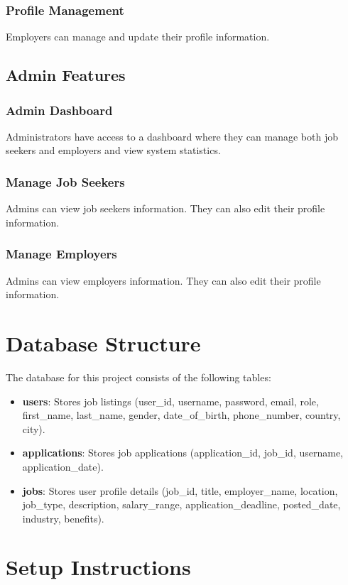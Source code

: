 \documentclass[a4paper,12pt]{article}
\begin{document}
\subsubsection{Profile Management}
Employers can manage and update their profile information.

\newpage

\subsection{Admin Features}
\subsubsection{Admin Dashboard}
Administrators have access to a dashboard where they can manage both job seekers and employers and view system statistics.

\subsubsection{Manage Job Seekers}
Admins can view job seekers information. They can also edit their profile information.

\subsubsection{Manage Employers}
Admins can view employers information. They can also edit their profile information.
\newpage

\section{Database Structure}
The database for this project consists of the following tables:
\begin{itemize}
    \item \textbf{users}: Stores job listings (user\_id, username, password, email, role, first\_name, last\_name, gender, date\_of\_birth, phone\_number, country, city).
    \item \textbf{applications}: Stores job applications (application\_id, job\_id, username, application\_date).
    \item \textbf{jobs}: Stores user profile details (job\_id, title, employer\_name, location, job\_type, description, salary\_range, application\_deadline, posted\_date, industry, benefits).
\end{itemize}

\newpage

\section{Setup Instructions}
\end{document}
